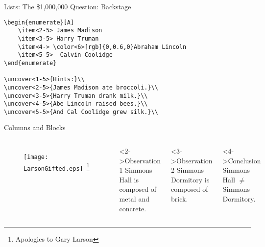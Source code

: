 \documentclass[pdf]{beamer}
\begin{document}
\begin{frame}[fragile]{Lists: The \$1,000,000 Question: Backstage}
\begin{verbatim}
\begin{enumerate}[A]
    \item<2-5> James Madison
    \item<3-5> Harry Truman
    \item<4-> \color<6>[rgb]{0,0.6,0}Abraham Lincoln
    \item<5-5>  Calvin Coolidge
\end{enumerate}

\uncover<1-5>{Hints:}\\
\uncover<2-5>{James Madison ate broccoli.}\\
\uncover<3-5>{Harry Truman drank milk.}\\
\uncover<4-5>{Abe Lincoln raised bees.}\\
\uncover<5-5>{And Cal Coolidge grew silk.}\\
\end{verbatim}
\end{frame}

\begin{frame}{Columns and Blocks}
\begin{columns}
  \begin{figure}[ht]
  \begin{center}
  \texttt{[image: LarsonGifted.eps]}~\footnote{Apologies to
  Gary Larson}
  \end{center}
  \end{figure}
  
  \begin{block}<2->{Observation 1}
    Simmons Hall is composed of metal and concrete.
  \end{block}
  \begin{block}<3->{Observation 2}
    Simmons Dormitory is composed of brick.
  \end{block}
  \begin{block}<4->{Conclusion}
    Simmons Hall $\not=$ Simmons Dormitory.
  \end{block}
\end{columns}
\end{frame}
\end{document}
